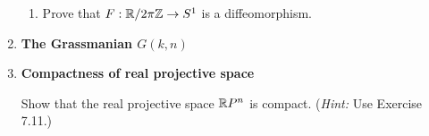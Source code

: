 \documentclass[10pt,a4paper]{report}
\begin{document}
\begin{enumerate}[label=7.\arabic*.]
\begin{enumerate}[label=(\alph*)]
		\item Prove that $F: \mathbb{R}/2\pi\mathbb{Z} \to S^1$ is a diffeomorphism.
	
	\end{enumerate}
	
	\item \textbf{The Grassmanian $G(k,n)$}
	
	\item \textbf{Compactness of real projective space}
	
	Show that the real projective space $\mathbb{R} P^n$ is compact. (\textit{Hint:} Use Exercise 7.11.)
	

\end{enumerate}
\end{document}
